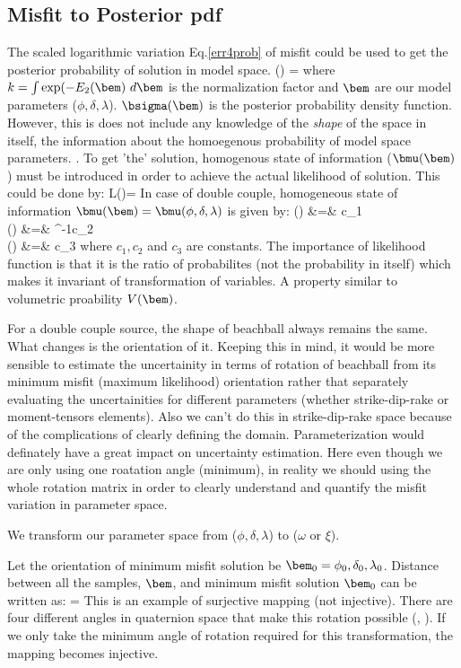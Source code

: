 \documentclass[11pt,titlepage,fleqn]{article}
\begin{document}
\subsection{Misfit to Posterior pdf}
The scaled logarithmic variation Eq.\ref{err4prob} of misfit could be used to get the posterior probability of solution in model space. 
\eq
\sigma(\bem) = 
\en
where $k = \int \exp (-E_2(\bem)\ d\bem$ is the normalization factor and $\bem$ are our model parameters ($\phi,\delta,\lambda$). $\bsigma(\bem)$ is the posterior probability density function. However, this is does not include any knowledge of the {\it shape} of the space in itself, \ie the information about the homoegenous probability of model space parameters. \citep{Tarantola_2006}. To get 'the' solution, homogenous state of information ($\bmu(\bem)$) must be introduced in order to achieve the actual likelihood of solution. This could be done by:
\eq
L(\bem)=\frac{\bsigma(\bem)}{\bmu(\bem)}
\en
In case of double couple, homogeneous state of information $\bmu(\bem) = \bmu(\phi,\delta,\lambda)$ is given by:
\eqa
\mu(\phi) &=& c_1\\
\mu(\delta) &=& \cos^{-1}c_2\\
\mu(\lambda) &=& c_3
\ena
where $c_1, c_2$ and $c_3$ are constants.
The importance of likelihood function is that it is the ratio of probabilites (not the probability in itself) which makes it invariant of transformation of variables. A property similar to volumetric proability $V(\bem)$.

For a double couple source, the shape of beachball always remains the same. What changes is the orientation of it. Keeping this in mind, it would be more sensible to estimate the uncertainity in terms of rotation of beachball from its minimum misfit (maximum likelihood) orientation rather that separately evaluating the uncertainities for different parameters (whether strike-dip-rake or moment-tensors elements). Also we can't do this in strike-dip-rake space because of the complications of clearly defining the domain. Parameterization would definately have a great impact on uncertainty estimation. Here even though we are only using one roatation angle (minimum), in reality we should using the whole rotation matrix in order to clearly understand and quantify the misfit variation in parameter space.

We transform our parameter space from ($\phi,\delta,\lambda$) to ($\omega$ or $\xi$). 

Let the orientation of minimum misfit solution be $\bem_0 = {\phi_0, \delta_0, \lambda_0}$. Distance between all the samples, $\bem$, and minimum misfit solution $\bem_0$ can be written as:
 = \bxi
\en
This is an example of surjective mapping (not injective). There are four different angles in quaternion space that make this rotation possible (\cite{Kagan1991}, \cite{TapeTape2012kagan}). If we only take the minimum angle of rotation required for this transformation, the mapping becomes injective.
\end{document}

